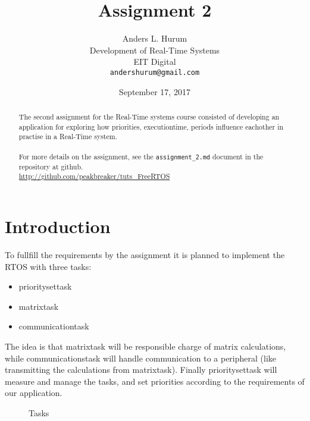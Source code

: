 \documentclass[12pt,fleqn,leqno,letterpaper]{article}
\title{Assignment 2}
\author{Anders L. Hurum\\
    \small{Development of Real-Time Systems}\\
    \small{EIT Digital}\\
    \small{\texttt{andershurum@gmail.com}}
}
\date{September 17, 2017}
\begin{document}
    \maketitle

    \begin{abstract}
        
        The second assignment for the Real-Time systems course consisted of developing 
        an application for exploring how priorities, executiontime, periods influence eachother
        in practise in a Real-Time system. \\ \\
        For more details on the assignment, see the \texttt{assignment\_2.md} document 
        in the repository at github. \\
        
        \url{http://github.com/peakbreaker/tuts\_FreeRTOS}

    \end{abstract}

    \newpage

    \section*{Introduction}
    To fullfill the requirements by the assignment it is planned to implement the RTOS
    with three tasks: 

    \begin{itemize}
        \item prioritysettask
        \item matrixtask
        \item communicationtask 
    \end{itemize} 

    The idea is that matrixtask will be responsible charge of matrix calculations, while 
    communicationstask will handle communication to a peripheral (like transmitting the calculations from matrixtask).
    Finally prioritysettask will measure and manage the tasks, and set priorities according to the requirements
    of our application. \\

    \begin{figure}[h] 
        \centering
        \caption{Tasks}
        \label{figure:tasks}
    \end{figure}
\end{document}
